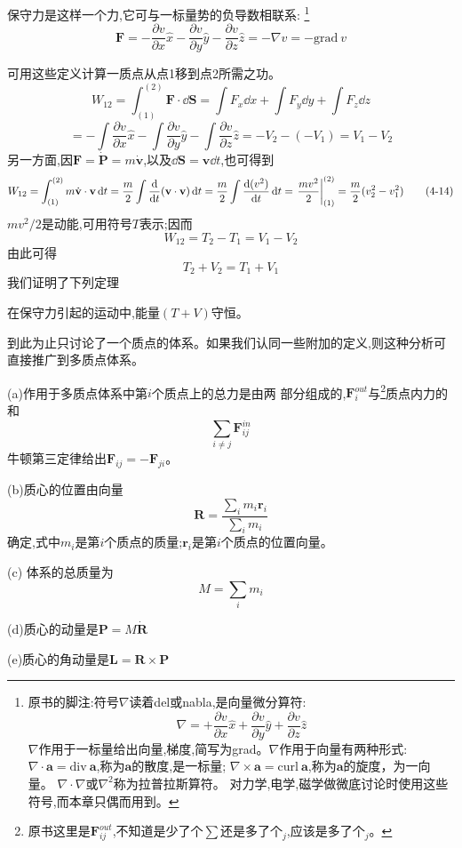 \begin{definition}[保守力]
    保守力是这样一个力,它可与一标量势的负导数相联系:
    \footnote{原书的脚注:符号$\nabla$读着del或nabla,是向量微分算符:
    \[\nabla=+\frac{\partial v}{\partial x}\hat{x}+\frac{\partial v}{\partial y}\hat{y}+\frac{\partial v}{\partial z}\hat{z}\]
    $\nabla$作用于一标量给出向量,梯度,简写为grad。$\nabla$作用于向量有两种形式: 
    $\nabla \cdot \mathbf{a}=\text{div} \ \mathbf{a}$,称为$\mathbf{a}$的散度,是一标量;
    $\nabla \times \mathbf{a}=\text{curl} \ \mathbf{a}$,称为$\mathbf{a}$的旋度，为一向量。
    $\nabla \cdot \nabla$或$\nabla^2$称为拉普拉斯算符。
    对力学,电学,磁学做微底讨论时使用这些符号,而本章只偶而用到。}
    \[\mathbf{F}=-\frac{\partial v}{\partial x}\hat{x}-\frac{\partial v}{\partial y}\hat{y}-\frac{\partial v}{\partial z}\hat{z}=-\nabla v=-\text{grad} \ v \tag{4-12}\]
\end{definition}

可用这些定义计算一质点从点1移到点2所需之功。
\[W_{12}=\int_{(1)}^{(2)}\mathbf{F} \cdot \dd{\mathbf{S}}=\int F_x\dd{x}+\int F_y\dd{y}+\int F_z\dd{z}\]
\[=-\int\frac{\partial v}{\partial x}\hat{x}-\int\frac{\partial v}{\partial y}\hat{y}-\int\frac{\partial v}{\partial z}\hat{z}=-V_2-(-V_1)=V_1-V_2 \tag{4-13}\]
另一方面,因$\mathbf{F}=\dot{\mathbf{P}}=m\dot{\mathbf{v}}$,以及$\dd{\mathbf{S}}=\mathbf{v}\dd{t}$,也可得到
\[W_{12}=\int_{(1)}^{(2)}m\dot{\mathbf{v}} \cdot \mathbf{v}\dd{t}=\frac{m}{2}\int\dv{t}(\mathbf{v} \cdot \mathbf{v})\dd{t}=\frac{m}{2}\int\dv{(v^2)}{t}\dd{t}=\eval{\frac{mv^2}{2}}_{(1)}^{(2)}=\frac{m}{2}(v_2^2-v_1^2) \tag{4-14}\]
$mv^2/2$是动能,可用符号$T$表示;因而
\[W_{12}=T_2-T_1=V_1-V_2 \tag{4-15}\]
由此可得
\[T_2+V_2=T_1+V_1 \tag{4-16}\]
我们证明了下列定理

\begin{theorem}
    在保守力引起的运动中,能量$(T+V)$守恒。
\end{theorem}

到此为止只讨论了一个质点的体系。如果我们认同一些附加的定义,则这种分析可直接推广到多质点体系。
\begin{definition}[多质点体系]
    (a)作用于多质点体系中第$i$个质点上的总力是由两
    部分组成的,$\mathbf{F}^{out}_{i}$与\footnote{原书这里是$\mathbf{F}^{out}_{ij}$,不知道是少了个$\sum$还是多了个$_j$,应该是多了个$_j$。}质点内力的和
    \[\sum_{i \neq j}\mathbf{F}^{in}_{ij}\]
    牛顿第三定律给出$\mathbf{F}_{ij}=-\mathbf{F}_{ji}$。
    
    (b)质心的位置由向量
    \[\mathbf{R}=\frac{\sum_im_i\mathbf{r}_i}{\sum_im_i} \tag{4-17}\]
    确定,式中$m_i$是第$i$个质点的质量;$\mathbf{r}_i$是第$i$个质点的位置向量。
    
    (c) 体系的总质量为\[M=\sum_im_i\]
    
    (d)质心的动量是$\mathbf{P}=M\dot{\mathbf{R}}$
    
    (e)质心的角动量是$\mathbf{L}=\mathbf{R} \times \mathbf{P}$
\end{definition}

